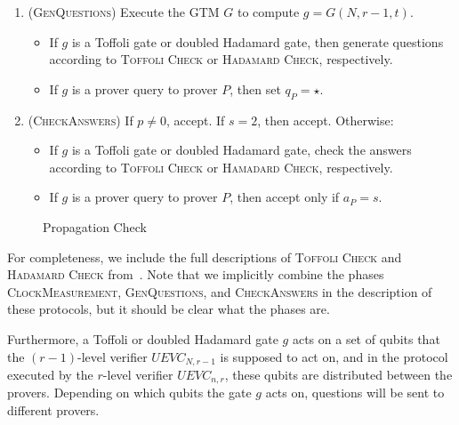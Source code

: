 \begin{center}
\begin{mdframed}
\begin{enumerate}
	\item (\textsc{GenQuestions}) Execute the GTM $G$ to compute $g = G(N,r-1,t)$. 
	\begin{itemize}
		\item If $g$ is a Toffoli gate or doubled Hadamard gate, then generate questions according to \textsc{Toffoli Check} or \textsc{Hadamard Check}, respectively. 
		\item If $g$ is a prover query to prover $P$, then set $q_P = \star$. 	
	\end{itemize}
		\item (\textsc{CheckAnswers}) If $p \neq 0$, accept. If $s = 2$, then accept. Otherwise:
		\begin{itemize}
			\item If $g$ is a Toffoli gate or doubled Hadamard gate, check the answers according to \textsc{Toffoli Check} or \textsc{Hamadard Check}, respectively. 
			\item If $g$ is a prover query to prover $P$, then accept only if $a_P = s$. 
		\end{itemize}
	\end{enumerate}    
\end{mdframed}

\end{center}
\begin{figure}[H]
\caption{Propagation Check}
\label{fig:prop_check}
\end{figure}

For completeness, we include the full descriptions of \textsc{Toffoli Check} and \textsc{Hadamard Check} from~\cite{ji2016compression}. Note that we implicitly combine the phases \textsc{ClockMeasurement}, \textsc{GenQuestions}, and \textsc{CheckAnswers} in the description of these protocols, but it should be clear what the phases are.

Furthermore, a Toffoli or doubled Hadamard gate $g$ acts on a set of qubits that the $(r-1)$-level verifier $UEVC_{N,r-1}$ is supposed to act on, and in the protocol executed by the $r$-level verifier $UEVC_{n,r}$, these qubits are distributed between the provers. Depending on which qubits the gate $g$ acts on, questions will be sent to different provers. 

